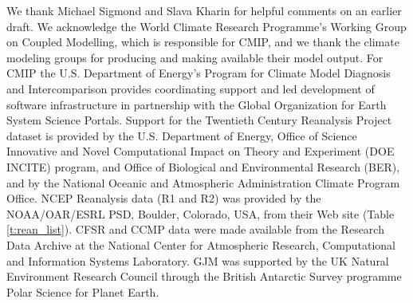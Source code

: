 \documentclass{ametsoc}
\begin{document}
%
\acknowledgments
We thank Michael Sigmond and Slava Kharin for helpful comments on an earlier draft.
We acknowledge the World Climate Research Programme's Working Group on 
Coupled Modelling, which is responsible for CMIP, and we thank the climate 
modeling groups for producing and making available their model output. For 
CMIP the U.S. Department of Energy's Program for Climate Model Diagnosis
and Intercomparison provides coordinating support and led 
development of software infrastructure in partnership with the Global 
Organization for Earth System Science Portals. Support for the Twentieth Century 
Reanalysis Project dataset is provided by the U.S. Department of Energy, Office of 
Science Innovative and Novel Computational Impact on Theory and Experiment (DOE INCITE) 
program, and Office of Biological and Environmental Research (BER), and by the National 
Oceanic and Atmospheric Administration Climate Program Office. NCEP Reanalysis data 
(R1 and R2) was provided by the NOAA/OAR/ESRL PSD, Boulder, Colorado, USA, from their 
Web site (Table \ref{t:rean_list}). CFSR and CCMP data were made available from the Research 
Data Archive at the National Center for Atmospheric Research, Computational and 
Information Systems Laboratory. GJM was supported by the UK Natural Environment Research 
Council through the British Antarctic Survey programme Polar Science for Planet Earth.

%



\end{document}

